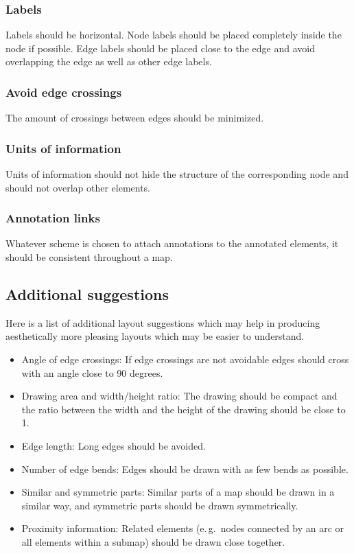 \subsubsection{Labels}

Labels should be horizontal. Node labels should be placed completely inside the node if possible. Edge labels should be placed close to the edge and avoid overlapping the edge as well as other edge labels.

\subsubsection{Avoid edge crossings}

The amount of crossings between edges should be minimized.

\subsubsection{Units of information}

Units of information should not hide the structure of the corresponding node and should not overlap other elements.

\subsubsection{Annotation links}

Whatever scheme is chosen to attach annotations to the annotated elements, it should be consistent throughout a map.

\subsection{Additional suggestions}

Here is a list of additional layout suggestions which may help in producing aesthetically more pleasing layouts which may be easier to understand.

\begin{itemize}
  \item Angle of edge crossings: If edge crossings are not avoidable edges should cross with an angle close to 90 degrees.
  \item Drawing area and width/height ratio: The drawing should be compact and the ratio between the width and the height of the drawing should be close to 1.
  \item Edge length: Long edges should be avoided.
  \item Number of edge bends: Edges should be drawn with as few bends as possible.
  \item Similar and symmetric parts: Similar parts of a map should be drawn in a similar way, and symmetric parts should be drawn symmetrically.
  \item Proximity information: Related elements (e.\,g.~nodes connected by an arc or all elements within a submap) should be drawn close together.
\end{itemize} 

